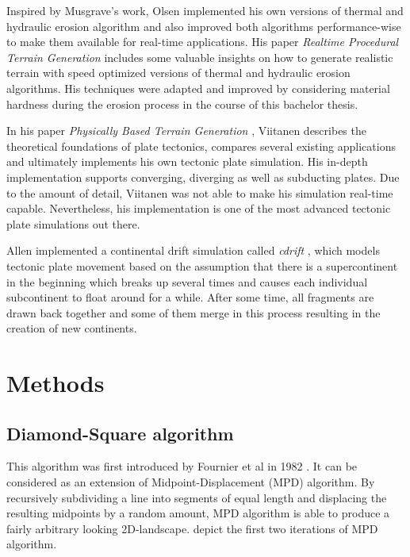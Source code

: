 \documentclass[11pt,a4paper,twoside,openright]{report}
\begin{document}
Inspired by Musgrave's work, Olsen implemented his own versions of thermal and hydraulic erosion algorithm and also improved both algorithms performance-wise to make them available for real-time applications. His paper \emph{Realtime Procedural Terrain Generation} \cite{Olsen:2004} includes some valuable insights on how to generate realistic terrain with speed optimized versions of thermal and hydraulic erosion algorithms. His techniques were adapted and improved by considering material hardness during the erosion process in the course of this bachelor thesis.

In his paper \emph{Physically Based Terrain Generation} \cite{Viitanen:2012}, Viitanen describes the theoretical foundations of plate tectonics, compares several existing applications and ultimately implements his own tectonic plate simulation. His in-depth implementation supports converging, diverging as well as subducting plates. Due to the amount of detail, Viitanen was not able to make his simulation real-time capable. Nevertheless, his implementation is one of the most advanced tectonic plate simulations out there.

Allen implemented a continental drift simulation called \emph{cdrift} \cite{Allen:1991}, which models tectonic plate movement based on the assumption that there is a supercontinent in the beginning which breaks up several times and causes each individual subcontinent to float around for a while. After some time, all fragments are drawn back together and some of them merge in this process resulting in the creation of new continents.
\chapter{Methods}
\label{sec:methods}

\section{Diamond-Square algorithm}
This algorithm was first introduced by Fournier et al in 1982 \cite{Fournier:1982:CRS:358523.358553}. It can be considered as an extension of Midpoint-Displacement (MPD) algorithm. By recursively subdividing a line into segments of equal length and displacing the resulting midpoints by a random amount, MPD algorithm is able to produce a fairly arbitrary looking 2D-landscape.  depict the first two iterations of MPD algorithm.
\end{document}
